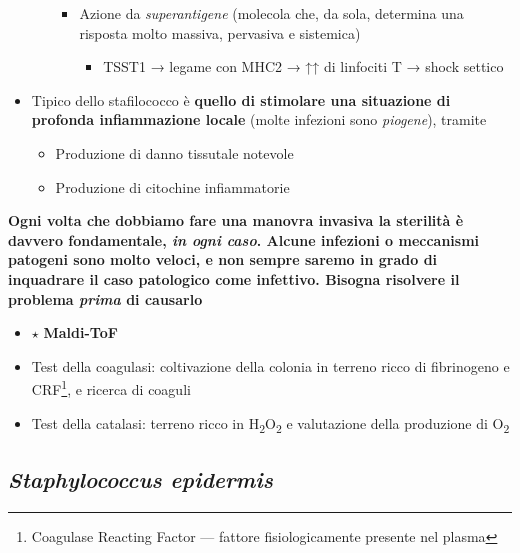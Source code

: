 \documentclass[italian,]{article}
\providecommand{\tightlist}{%
  \setlength{\itemsep}{0pt}\setlength{\parskip}{0pt}}
\newcommand{\normalbox}[2]{\begin{tcolorbox}[title=#1]#2\end{tcolorbox}} %
\newcommand{\redbox}[2]{\begin{tcolorbox}[title=#1,colback=red!5,colframe=red!75!black]#2\end{tcolorbox}} %
\newcommand{\goldstandard}{\textcircled{$\star$} }                      %
\begin{document}
\begin{itemize}
\begin{itemize}
    \begin{itemize}
    \tightlist
    \item
      Azione da \emph{superantigene} (molecola che, da sola, determina
      una risposta molto massiva, pervasiva e sistemica)

      \begin{itemize}
      \tightlist
      \item
        TSST1 → legame con MHC2 → ↑↑ di linfociti T → shock settico
      \end{itemize}
    \end{itemize}
  \end{itemize}
\item
  Tipico dello stafilococco è \textbf{quello di stimolare una situazione
  di profonda infiammazione locale} (molte infezioni sono
  \emph{piogene}), tramite

  \begin{itemize}
  \tightlist
  \item
    Produzione di danno tissutale notevole
  \item
    Produzione di citochine infiammatorie
  \end{itemize}
\end{itemize}

\redbox{Ci portiamo a casa}{
\textbf{Ogni volta che dobbiamo fare una manovra invasiva la sterilità è davvero fondamentale, \emph{in ogni caso}. Alcune infezioni o meccanismi patogeni sono molto veloci, e non sempre saremo in grado di inquadrare il caso patologico come infettivo. Bisogna risolvere il problema \emph{prima} di causarlo}
}

\normalbox{Metodiche specifiche di identificazione}{
\begin{itemize}
\tightlist
\item \goldstandard \textbf{Maldi-ToF}
\item Test della coagulasi: coltivazione della colonia in terreno ricco di fibrinogeno e CRF\footnote{Coagulase Reacting Factor --- fattore fisiologicamente presente nel plasma}, e ricerca di coaguli
\item Test della catalasi: terreno ricco in H\textsubscript{2}O\textsubscript{2} e valutazione della produzione di O\textsubscript{2}
\end{itemize}
}

\hypertarget{staphylococcus-epidermis}{%
\subsection{\texorpdfstring{\emph{Staphylococcus
epidermis}}{Staphylococcus epidermis}}\label{staphylococcus-epidermis}}
\end{document}
